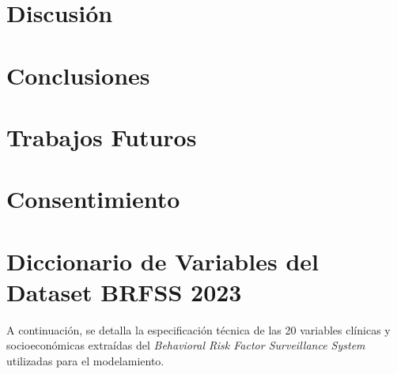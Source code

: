 \documentclass[journal]{IEEEtran}
\begin{document}
\section{Discusión}

\section{Conclusiones}

\section{Trabajos Futuros}

\section{Consentimiento}


\appendices
\section{Diccionario de Variables del Dataset BRFSS 2023}
\label{apendice:variables}

A continuación, se detalla la especificación técnica de las 20 variables clínicas y socioeconómicas extraídas del \textit{Behavioral Risk Factor Surveillance System} utilizadas para el modelamiento.
\end{document}
